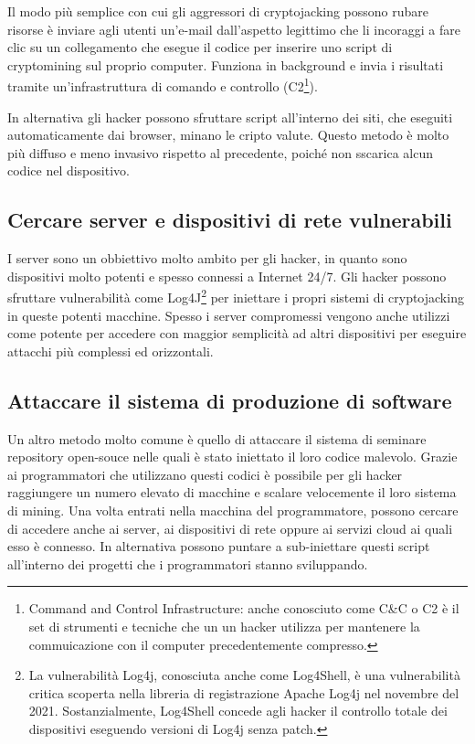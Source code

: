 \documentclass[12pt,a4paper]{article}
\begin{document}
Il modo più semplice con cui gli aggressori di cryptojacking possono rubare
risorse è inviare agli utenti un'e-mail dall'aspetto legittimo che li incoraggi
a fare clic su un collegamento che esegue il codice per inserire uno script di
cryptomining sul proprio computer. Funziona in background e invia i risultati
tramite un'infrastruttura di comando e controllo (C2\footnote{Command and
Control Infrastructure: anche conosciuto come C\&C o C2 è il set di strumenti e
tecniche che un un hacker utilizza per mantenere la commuicazione con il
computer precedentemente compresso.}).

In alternativa gli hacker possono sfruttare script all'interno dei siti, che eseguiti 
automaticamente dai browser, minano le cripto valute. Questo metodo è molto più
diffuso e meno invasivo rispetto al precedente, poiché non sscarica alcun codice nel dispositivo.

\subsection{Cercare server e dispositivi di rete vulnerabili}
I server sono un obbiettivo molto ambito per gli hacker, in quanto sono
dispositivi molto potenti e spesso connessi a Internet 24/7. Gli hacker possono
sfruttare vulnerabilità come Log4J\footnote{La vulnerabilità Log4j, conosciuta
anche come Log4Shell, è una vulnerabilità critica scoperta nella libreria di
registrazione Apache Log4j nel novembre del 2021. Sostanzialmente, Log4Shell
concede agli hacker il controllo totale dei dispositivi eseguendo versioni di
Log4j senza patch.\cite{Log4J}} per iniettare i propri sistemi di cryptojacking in queste
potenti macchine. Spesso i server compromessi vengono anche utilizzi come
potente per accedere con maggior semplicità ad altri
dispositivi per eseguire attacchi più complessi ed orizzontali.

\subsection{Attaccare il sistema di produzione di software}
Un altro metodo molto comune è quello di attaccare il sistema di seminare
repository open-souce nelle quali è stato iniettato il loro codice malevolo.
Grazie ai programmatori che utilizzano questi codici è possibile per 
gli hacker raggiungere un numero elevato di macchine e scalare velocemente 
il loro sistema di mining.
Una volta entrati nella macchina del programmatore, possono cercare di accedere
anche ai server, ai dispositivi di rete oppure ai servizi cloud ai quali esso è
connesso. In alternativa possono puntare a sub-iniettare questi script all'interno 
dei progetti che i programmatori stanno sviluppando.
\end{document}
